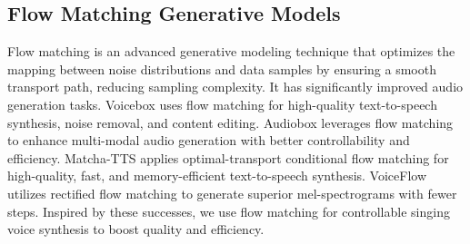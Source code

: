 \subsection{Flow Matching Generative Models}

Flow matching \cite{lipman2022flow} is an advanced generative modeling technique that optimizes the mapping between noise distributions and data samples by ensuring a smooth transport path, reducing sampling complexity. It has significantly improved audio generation tasks.
Voicebox \citep{le2024voicebox} uses flow matching for high-quality text-to-speech synthesis, noise removal, and content editing.
Audiobox \citep{vyas2023audiobox} leverages flow matching to enhance multi-modal audio generation with better controllability and efficiency. 
Matcha-TTS \citep{mehta2024matcha} applies optimal-transport conditional flow matching for high-quality, fast, and memory-efficient text-to-speech synthesis. 
VoiceFlow \citep{guo2024voiceflow} utilizes rectified flow matching to generate superior mel-spectrograms with fewer steps.
Inspired by these successes, we use flow matching for controllable singing voice synthesis to boost quality and efficiency.